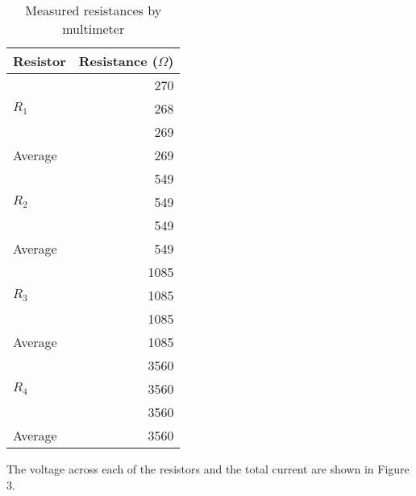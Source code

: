 \documentclass [12pt, letterpaper, twoside] {article}
\begin{document}
\begin{table}[h!]
  \centering
  \begin{tabular}{| l | r |}
    \hline\hline
    Resistor & Resistance (\(\Omega\)) \\
    \hline
    \multirow {3}{*}{\(R_{1}\)} & 270 \\
    & 268 \\
    & 269 \\
    \hline
    Average & 269 \\
    \hline
    \multirow {3}{*}{\(R_{2}\)} & 549 \\
    & 549 \\
    & 549 \\
    \hline
    Average & 549 \\
    \hline
    \multirow {3}{*}{\(R_{3}\)} & 1085 \\
    & 1085 \\
    & 1085 \\
    \hline
    Average & 1085 \\
    \hline
    \multirow {3}{*}{\(R_{4}\)} & 3560 \\
    & 3560 \\
    & 3560 \\
    \hline
    Average & 3560 \\
    \hline\hline
  \end{tabular}
  \caption{Measured resistances by multimeter}
\end{table}


\noindent
The voltage across each of the resistors and the total current are shown in Figure 3.
\end{document}
